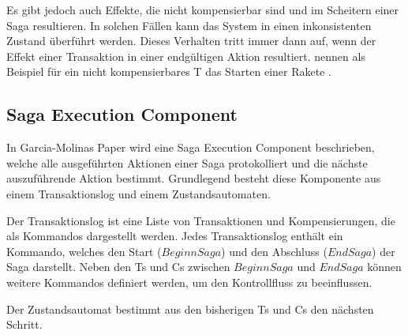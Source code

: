 Es gibt jedoch auch Effekte, die nicht kompensierbar sind und im Scheitern einer Saga resultieren. In solchen Fällen kann das System in einen inkonsistenten Zustand überführt werden. Dieses Verhalten tritt immer dann auf, wenn der Effekt einer Transaktion in einer endgültigen Aktion resultiert. \citeauthor{GarciaMolina.1987} nennen als Beispiel für ein nicht kompensierbares T das Starten einer Rakete \cite[p.257]{GarciaMolina.1987}.

\subsection{Saga Execution Component} %
In Garcia-Molinas Paper wird eine Saga Execution Component beschrieben, welche alle ausgeführten Aktionen einer Saga protokolliert und die nächste auszuführende Aktion bestimmt. Grundlegend besteht diese Komponente aus einem Transaktionslog und einem Zustandsautomaten. 

Der Transaktionslog ist eine Liste von Transaktionen und Kompensierungen, die als Kommandos dargestellt werden. Jedes Transaktionslog enthält ein Kommando, welches den Start ($Beginn Saga$) und den Abschluss ($End Saga$) der Saga darstellt. Neben den Ts und Cs zwischen $Beginn Saga$ und $End Saga$ können weitere Kommandos definiert werden, um den Kontrollfluss zu beeinflussen. 

Der Zustandsautomat bestimmt aus den bisherigen Ts und Cs den nächsten Schritt. 